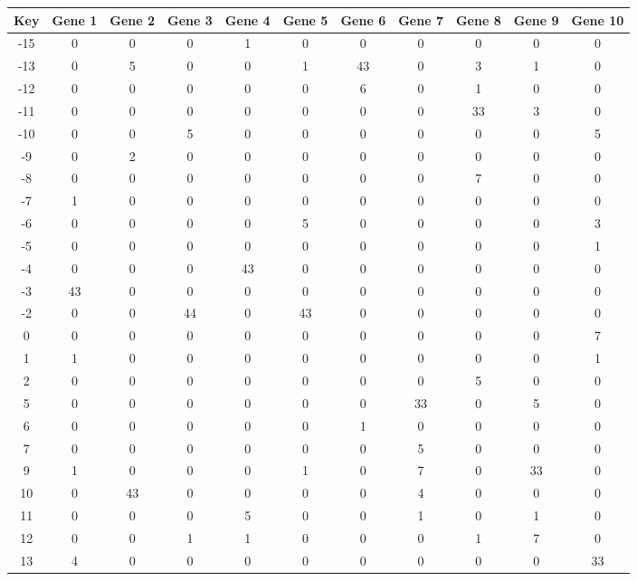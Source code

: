 \begin{tabular}{|c|c|c|c|c|c|c|c|c|c|c|}
\hline
Key & Gene 1 & Gene 2 & Gene 3 & Gene 4 & Gene 5 & Gene 6 & Gene 7 & Gene 8 & Gene 9 & Gene 10 \\
\hline
-15 & 0 & 0 & 0 & 1 & 0 & 0 & 0 & 0 & 0 & 0 \\
-13 & 0 & 5 & 0 & 0 & 1 & 43 & 0 & 3 & 1 & 0 \\
-12 & 0 & 0 & 0 & 0 & 0 & 6 & 0 & 1 & 0 & 0 \\
-11 & 0 & 0 & 0 & 0 & 0 & 0 & 0 & 33 & 3 & 0 \\
-10 & 0 & 0 & 5 & 0 & 0 & 0 & 0 & 0 & 0 & 5 \\
-9 & 0 & 2 & 0 & 0 & 0 & 0 & 0 & 0 & 0 & 0 \\
-8 & 0 & 0 & 0 & 0 & 0 & 0 & 0 & 7 & 0 & 0 \\
-7 & 1 & 0 & 0 & 0 & 0 & 0 & 0 & 0 & 0 & 0 \\
-6 & 0 & 0 & 0 & 0 & 5 & 0 & 0 & 0 & 0 & 3 \\
-5 & 0 & 0 & 0 & 0 & 0 & 0 & 0 & 0 & 0 & 1 \\
-4 & 0 & 0 & 0 & 43 & 0 & 0 & 0 & 0 & 0 & 0 \\
-3 & 43 & 0 & 0 & 0 & 0 & 0 & 0 & 0 & 0 & 0 \\
-2 & 0 & 0 & 44 & 0 & 43 & 0 & 0 & 0 & 0 & 0 \\
0 & 0 & 0 & 0 & 0 & 0 & 0 & 0 & 0 & 0 & 7 \\
1 & 1 & 0 & 0 & 0 & 0 & 0 & 0 & 0 & 0 & 1 \\
2 & 0 & 0 & 0 & 0 & 0 & 0 & 0 & 5 & 0 & 0 \\
5 & 0 & 0 & 0 & 0 & 0 & 0 & 33 & 0 & 5 & 0 \\
6 & 0 & 0 & 0 & 0 & 0 & 1 & 0 & 0 & 0 & 0 \\
7 & 0 & 0 & 0 & 0 & 0 & 0 & 5 & 0 & 0 & 0 \\
9 & 1 & 0 & 0 & 0 & 1 & 0 & 7 & 0 & 33 & 0 \\
10 & 0 & 43 & 0 & 0 & 0 & 0 & 4 & 0 & 0 & 0 \\
11 & 0 & 0 & 0 & 5 & 0 & 0 & 1 & 0 & 1 & 0 \\
12 & 0 & 0 & 1 & 1 & 0 & 0 & 0 & 1 & 7 & 0 \\
13 & 4 & 0 & 0 & 0 & 0 & 0 & 0 & 0 & 0 & 33 \\
\hline
\end{tabular}